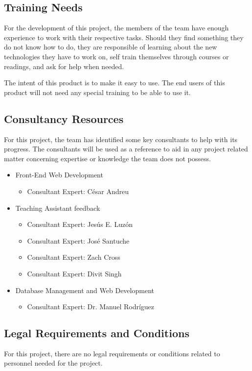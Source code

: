 \subsection{Training Needs}

For the development of this project, the members of the team have enough
experience to work with their respective tasks. Should they find something they
do not know how to do, they are responsible of learning about the new
technologies they have to work on, self train themselves through courses or
readings, and ask for help when needed.

The intent of this product is to make it easy to use. The end users of this
product will not need any special training to be able to use it.

\subsection{Consultancy Resources}

For this project, the team has identified some key consultants to help with its
progress. The consultants will be used as a reference to aid in any project
related matter concerning expertise or knowledge the team does not possess.

\begin{itemize}
\item Front-End Web Development
\begin{itemize}
\item Consultant Expert: César Andreu
\end{itemize}
\item Teaching Assistant feedback
\begin{itemize}
\item Consultant Expert: Jesús E. Luzón
\item Consultant Expert: José Santuche
\item Consultant Expert: Zach Cross
\item Consultant Expert: Divit Singh
\end{itemize}
\item Database Management and Web Development
\begin{itemize}
\item Consultant Expert: Dr. Manuel Rodríguez
\end{itemize}
\end{itemize}

\subsection{Legal Requirements and Conditions}

For this project, there are no legal requirements or conditions related to
personnel needed for the project.